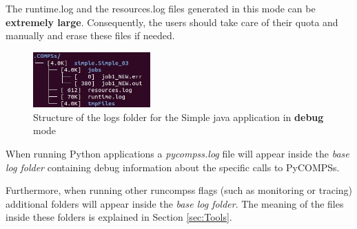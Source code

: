 The runtime.log and the resources.log files generated in this mode can be \textbf{extremely large}. Consequently, the users should
take care of their quota and manually and erase these files if needed. \newline

\begin{figure}[h!]
  \centering
    \includegraphics[width=0.4\textwidth]{./Sections/3_Results_and_Logs/Figures/simple_log_debug.jpeg}
    \caption{Structure of the logs folder for the Simple java application in \textbf{debug} mode}
    \label{fig:simple_log_debug}
\end{figure}

When running Python applications a \textit{pycompss.log} file will appear inside the \textit{base log folder} containing debug
information about the specific calls to PyCOMPSs. 

Furthermore, when running other runcompss flags (such as monitoring or tracing) additional folders will appear inside the 
\textit{base log folder}. The meaning of the files inside these folders is explained in Section \ref{sec:Tools}. 
